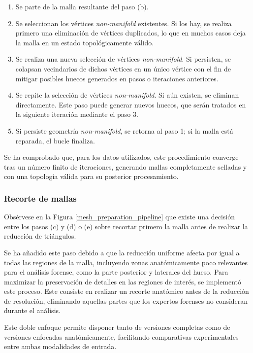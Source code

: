 \begin{enumerate}
    \item Se parte de la malla resultante del paso (b).
    \item Se seleccionan los vértices \textit{non-manifold} existentes. Si los hay, se realiza primero una eliminación de vértices duplicados, lo que en muchos casos deja la malla en un estado topológicamente válido.
    \item Se realiza una nueva selección de vértices \textit{non-manifold}. Si persisten, se colapsan vecindarios de dichos vértices en un único vértice con el fin de mitigar posibles huecos generados en pasos o iteraciones anteriores.
    \item Se repite la selección de vértices \textit{non-manifold}. Si aún existen, se eliminan directamente. Este paso puede generar nuevos huecos, que serán tratados en la siguiente iteración mediante el paso 3.
    \item Si persiste geometría \textit{non-manifold}, se retorna al paso 1; si la malla está reparada, el bucle finaliza.
\end{enumerate}

Se ha comprobado que, para los datos utilizados, este procedimiento converge tras un número finito de iteraciones, generando mallas completamente selladas y con una topología válida para su posterior procesamiento.

\subsubsection{Recorte de mallas}
Obsérvese en la Figura \ref{mesh_preparation_pipeline} que existe una decisión entre los pasos (c) y (d) o (e) sobre recortar primero la malla antes de realizar la reducción de triángulos.

Se ha añadido este paso debido a que la reducción uniforme afecta por igual a todas las regiones de la malla, incluyendo zonas anatómicamente poco relevantes para el análisis forense, como la parte posterior y laterales del hueso. Para maximizar la preservación de detalles en las regiones de interés, se implementó este proceso. Este consiste en realizar un recorte anatómico antes de la reducción de resolución, eliminando aquellas partes que los expertos forenses no consideran durante el análisis.

Este doble enfoque permite disponer tanto de versiones completas como de versiones enfocadas anatómicamente, facilitando comparativas experimentales entre ambas modalidades de entrada.

